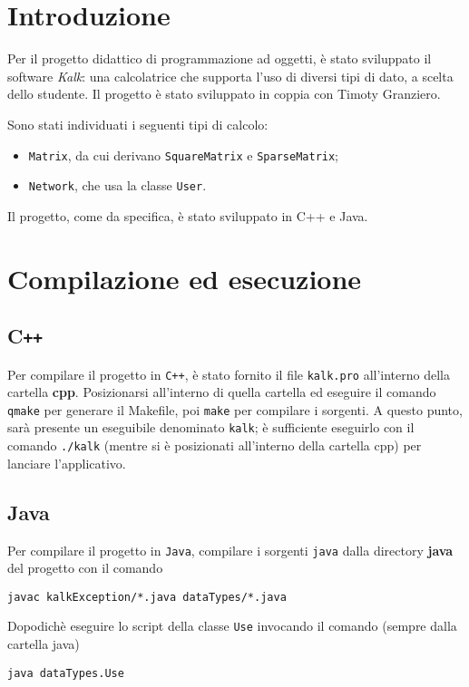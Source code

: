 


    
    \clearpage
    
    \tableofcontents
    \clearpage

\section{Introduzione}
Per il progetto didattico di programmazione ad oggetti, è stato sviluppato il software \textit{Kalk}:
una calcolatrice che supporta l'uso di diversi tipi di dato, a scelta dello studente. Il progetto
è stato sviluppato in coppia con Timoty Granziero. \par

Sono stati individuati i seguenti tipi di calcolo:
    \begin{itemize}
        \item \texttt{Matrix}, da cui derivano \texttt{SquareMatrix}
        e \texttt{SparseMatrix};
        \item \texttt{Network}, che usa la classe \texttt{User}.
    \end{itemize}

\noindent{}Il progetto, come da specifica, è stato sviluppato in C++ e Java.

\section{Compilazione ed esecuzione}
\subsection{C\texttt{++}} 
Per compilare il progetto in \texttt{C++}, è stato fornito il file \texttt{kalk.pro}
all'interno della cartella \textbf{cpp}. Posizionarsi all'interno di quella cartella ed eseguire il comando
\texttt{qmake} per generare il Makefile, poi \texttt{make} per compilare i sorgenti. A questo punto, sar\`a presente
un eseguibile denominato \texttt{kalk}; è sufficiente eseguirlo con il comando \texttt{./kalk} (mentre si è posizionati
all'interno della cartella cpp) per lanciare l'applicativo.

\subsection{Java} 
Per compilare il progetto in \texttt{Java}, compilare i sorgenti \texttt{java} dalla directory \textbf{java}
del progetto con il comando 
\begin{center}
    \texttt{javac kalkException/*.java dataTypes/*.java} \par
\end{center} 
Dopodichè eseguire lo script della classe \texttt{Use} invocando il comando (sempre dalla cartella java)
\begin{center}
    \texttt{java dataTypes.Use}
\end{center}

